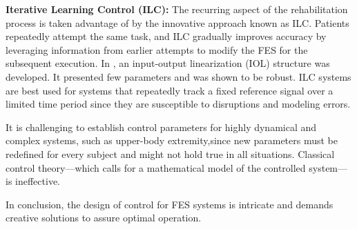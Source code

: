 \textbf{Iterative Learning Control (ILC):} The recurring aspect of the rehabilitation process is taken advantage of by the innovative approach known as ILC. Patients repeatedly attempt the same task, and ILC gradually improves accuracy by leveraging information from earlier attempts to modify the FES for the subsequent execution. In \cite{IOL}, an input-output linearization (IOL) structure was developed. It presented few parameters and was shown to be robust.  ILC systems are best used for systems that repeatedly track a fixed reference signal over a limited time period since they are susceptible to disruptions and modeling errors.

It is challenging to establish control parameters for highly dynamical and complex systems, such as upper-body extremity,since new parameters must be redefined for every subject and might not hold true in all situations. Classical control theory—which calls for a mathematical model of the controlled system—is ineffective.

In conclusion, the design of control for FES systems is intricate and demands creative solutions to assure optimal operation.